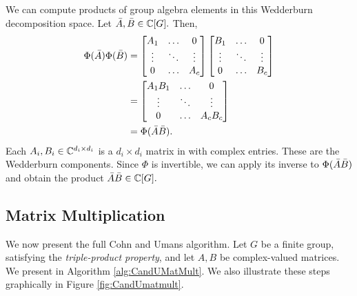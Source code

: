 \documentclass[../thesis.tex]{subfiles}
\begin{document}
We can compute products of group algebra elements in this Wedderburn decomposition space. Let $\Bar{A},\Bar{B}\in\mathbb{C}[G].$ Then,
\begin{equation}\label{eq:WedderburnProducts}
\begin{split}
    \Phi(\Bar{A})\Phi(\Bar{B})
                    &= \begin{bmatrix}
                        A_1 &\hdots &0 \\
                        \vdots & \ddots & \vdots\\
                        0 & \hdots & A_c
                    \end{bmatrix}
                    \begin{bmatrix}
                        B_1 &\hdots &0 \\
                        \vdots & \ddots & \vdots\\
                        0 & \hdots & B_c
                    \end{bmatrix}\\
                &= 
                \begin{bmatrix}
                    A_1B_1 & \hdots & 0\\
                    \vdots & \ddots & \vdots\\
                    0 & \hdots & A_cB_c
                \end{bmatrix}\\
                &= \Phi(\Bar{A}\Bar{B}).
\end{split}
\end{equation}
Each $A_i,B_i\in\mathbb{C}^{d_i\times d_i}$ is a $d_i\times d_i$ matrix in with complex entries. These are the Wedderburn components. Since $\Phi$ is invertible, we can apply its inverse to $\Phi(\Bar{A}\Bar{B})$ and obtain the product $\Bar{A}\Bar{B}\in\mathbb{C}[G].$

\subsection{Matrix Multiplication}
We now present the full Cohn and Umans \cite{CohnOld}\cite{CohnNew} algorithm. Let $G$ be a finite group, satisfying the \textit{triple-product property}, and  let $A,B$ be complex-valued matrices. We present  in Algorithm \ref{alg:CandUMatMult}. We also illustrate these steps graphically in Figure \ref{fig:CandUmatmult}.
\end{document}
